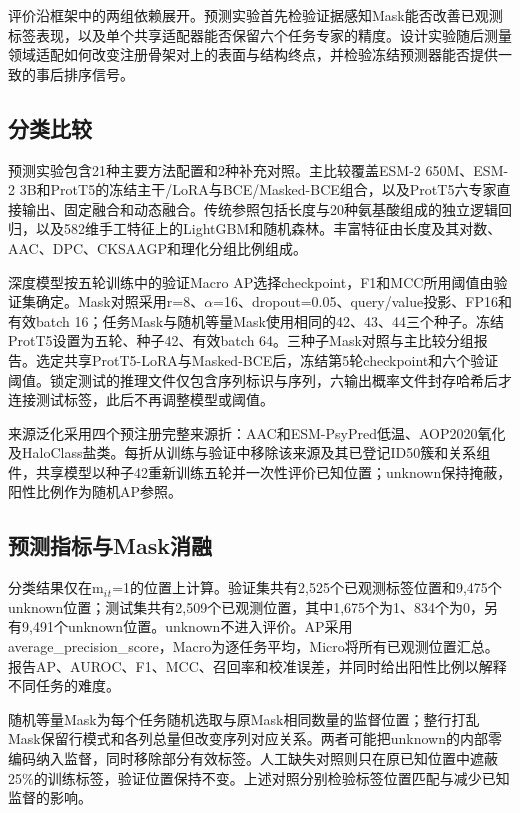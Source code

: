 \documentclass[conference]{IEEEtran}
\begin{document}
评价沿框架中的两组依赖展开。预测实验首先检验证据感知Mask能否改善已观测标签表现，以及单个共享适配器能否保留六个任务专家的精度。设计实验随后测量领域适配如何改变注册骨架对上的表面与结构终点，并检验冻结预测器能否提供一致的事后排序信号。

\subsection{分类比较}

预测实验包含21种主要方法配置和2种补充对照。主比较覆盖ESM-2 650M、ESM-2 3B和ProtT5的冻结主干/LoRA与BCE/Masked-BCE组合，以及ProtT5六专家直接输出、固定融合和动态融合。传统参照包括长度与20种氨基酸组成的独立逻辑回归，以及582维手工特征上的LightGBM和随机森林\cite{ref12,ref13}。丰富特征由长度及其对数、AAC、DPC、CKSAAGP和理化分组比例组成。

深度模型按五轮训练中的验证Macro AP选择checkpoint，F1和MCC所用阈值由验证集确定。Mask对照采用r=8、$\alpha$=16、dropout=0.05、query/value投影、FP16和有效batch 16；任务Mask与随机等量Mask使用相同的42、43、44三个种子。冻结ProtT5设置为五轮、种子42、有效batch 64。三种子Mask对照与主比较分组报告。选定共享ProtT5-LoRA与Masked-BCE后，冻结第5轮checkpoint和六个验证阈值。锁定测试的推理文件仅包含序列标识与序列，六输出概率文件封存哈希后才连接测试标签，此后不再调整模型或阈值。

来源泛化采用四个预注册完整来源折：AAC和ESM-PsyPred低温、AOP2020氧化及HaloClass盐类。每折从训练与验证中移除该来源及其已登记ID50簇和关系组件，共享模型以种子42重新训练五轮并一次性评价已知位置；unknown保持掩蔽，阳性比例作为随机AP参照。

\subsection{预测指标与Mask消融}

分类结果仅在m$_i$$_t$=1的位置上计算。验证集共有2,525个已观测标签位置和9,475个unknown位置；测试集共有2,509个已观测位置，其中1,675个为1、834个为0，另有9,491个unknown位置。unknown不进入评价。AP采用average\_precision\_score，Macro为逐任务平均，Micro将所有已观测位置汇总。报告AP、AUROC、F1、MCC、召回率和校准误差，并同时给出阳性比例以解释不同任务的难度。

随机等量Mask为每个任务随机选取与原Mask相同数量的监督位置；整行打乱Mask保留行模式和各列总量但改变序列对应关系。两者可能把unknown的内部零编码纳入监督，同时移除部分有效标签。人工缺失对照则只在原已知位置中遮蔽25\%的训练标签，验证位置保持不变。上述对照分别检验标签位置匹配与减少已知监督的影响。
\end{document}
